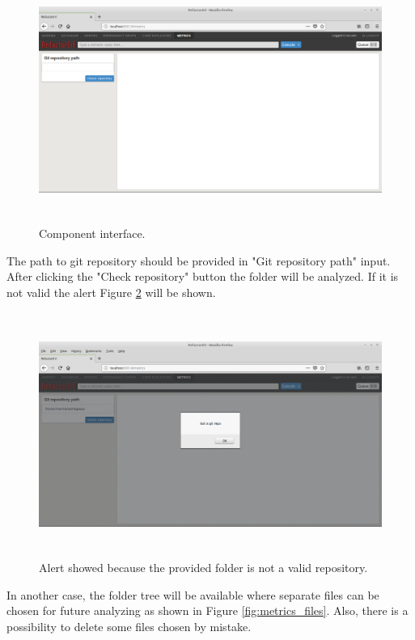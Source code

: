 \begin{figure}[h]
	\includegraphics[height=80mm]{figures/metrics.png}
	\caption{Component interface.}
	\label{fig:metrics_interface}
\end{figure}

The path to git repository should be provided in "Git repository path" input. After clicking the "Check repository" button the folder will be analyzed. If it is not valid the alert Figure \ref{fig:metrics_alert} will be shown.  

\begin{figure}[h]
	\includegraphics[height=80mm]{figures/alert.png}
	\caption{Alert showed because the provided folder is not a valid repository.}
	\label{fig:metrics_alert}
\end{figure}

In another case, the folder tree will be available where separate files can be chosen for future analyzing as shown in Figure \ref{fig:metrics_files}. Also, there is a possibility to delete some files chosen by mistake.

